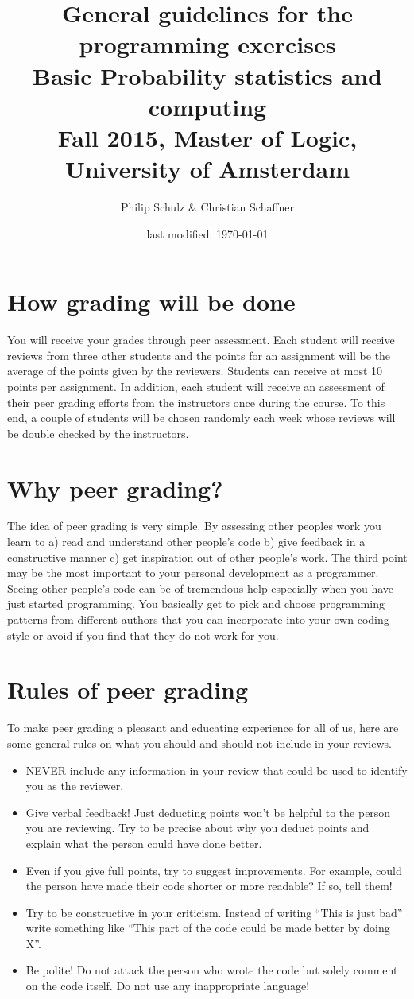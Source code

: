\documentclass[a4paper, leqno, 11pt]{article}
\title{General guidelines for the programming exercises \\
Basic Probability statistics and computing \\[2mm]
\large{Fall 2015, Master of Logic, University of Amsterdam}}
\author{Philip Schulz \& Christian Schaffner}
\date{last modified: \today}
\begin{document}
\maketitle

\section{How grading will be done}
You will receive your grades through peer assessment. Each student will receive reviews from three other students and the points for an assignment
will be the average of the points given by the reviewers. Students can receive at most 10 points per assignment. In addition,
each student will receive an assessment of their peer grading efforts from the instructors once during the course. To this end, a couple of students will
be chosen randomly each week whose reviews will be double checked by the instructors. 

\section{Why peer grading?}
The idea of peer grading is very simple. By assessing other peoples work you learn to a) read and understand other people's code 
b) give feedback in a constructive manner c) get inspiration out of other people's work. The third point may be the most important
to your personal development as a programmer. Seeing other people's code can be of tremendous help especially when you have just
started programming. You basically get to pick and choose programming patterns from different authors that you can incorporate
into your own coding style or avoid if you find that they do not work for you.

\section{Rules of peer grading}
To make peer grading a pleasant and educating experience for all of us, here are some general rules on what you should and should
not include in your reviews.
\begin{itemize}
\item NEVER include any information in your review that could be used to identify you as the reviewer.
\item Give verbal feedback! Just deducting points won't be helpful to the person you are reviewing. Try to be precise about why
you deduct points and explain what the person could have done better.
\item Even if you give full points, try to suggest improvements. For example, could the person have made their code shorter or more
readable? If so, tell them!
\item Try to be constructive in your criticism. Instead of writing ``This is just bad'' write something like ``This part of the code
could be made better by doing X''.
\item Be polite! Do not attack the person who wrote the code but solely comment on the code itself. Do not use any inappropriate language!
\end{itemize}
\end{document}
